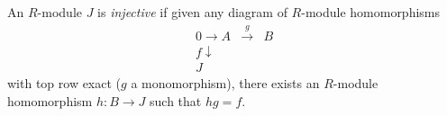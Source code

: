 An $R$-module $J$ is \emph{injective} if given any diagram of $R$-module homomorphisms
\[
\begin{array}{ccc}
0 \to A & \xrightarrow{g} & B \\
f \downarrow & & \\
J & &
\end{array}
\]
with top row exact ($g$ a monomorphism), there exists an $R$-module homomorphism $h : B \to J$ such that $hg = f$.
